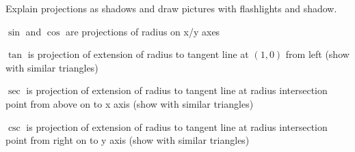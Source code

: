 \documentclass{exam}
\begin{document}
  Explain projections as shadows and draw pictures with flashlights and shadow.

  \begin{itemize*}
    \item $\sin$ and $\cos$ are projections of radius on x/y axes
    \item $\tan$ is projection of extension of radius to tangent line at $(1, 0)$ from left (show with similar triangles)
    \item $\sec$ is projection of extension of radius to tangent line at radius intersection point from above on to x
      axis (show with similar triangles)
    \item $\csc$ is projection of extension of radius to tangent line at radius intersection point from right on to y
      axis (show with similar triangles)
  \end{itemize*}
\end{document}
